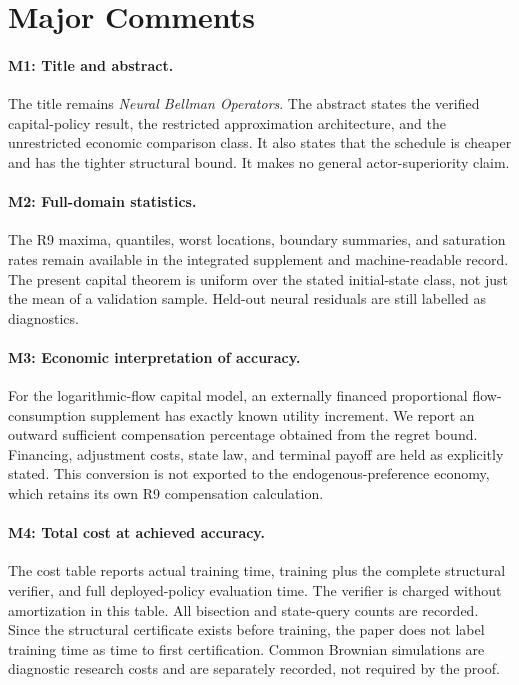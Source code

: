 \section{Major Comments}
\paragraph{M1: Title and abstract.}
The title remains \emph{Neural Bellman Operators}. The abstract states the verified capital-policy result, the restricted approximation architecture, and the unrestricted economic comparison class. It also states that the schedule is cheaper and has the tighter structural bound. It makes no general actor-superiority claim.

\paragraph{M2: Full-domain statistics.}
The R9 maxima, quantiles, worst locations, boundary summaries, and saturation rates remain available in the integrated supplement and machine-readable record. The present capital theorem is uniform over the stated initial-state class, not just the mean of a validation sample. Held-out neural residuals are still labelled as diagnostics.

\paragraph{M3: Economic interpretation of accuracy.}
For the logarithmic-flow capital model, an externally financed proportional flow-consumption supplement has exactly known utility increment. We report an outward sufficient compensation percentage obtained from the regret bound. Financing, adjustment costs, state law, and terminal payoff are held as explicitly stated. This conversion is not exported to the endogenous-preference economy, which retains its own R9 compensation calculation.

\paragraph{M4: Total cost at achieved accuracy.}
The cost table reports actual training time, training plus the complete structural verifier, and full deployed-policy evaluation time. The verifier is charged without amortization in this table. All bisection and state-query counts are recorded. Since the structural certificate exists before training, the paper does not label training time as time to first certification. Common Brownian simulations are diagnostic research costs and are separately recorded, not required by the proof.

